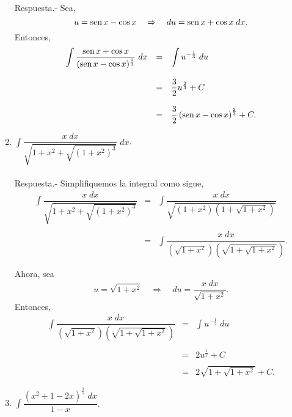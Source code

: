 \begin{enumerate}[\bfseries 1.]
	Respuesta.-\; Sea,
	$$u=\mathop{\mbox{\normalfont sen}}\nolimits x - \cos x\quad \Rightarrow \quad du=\mathop{\mbox{\normalfont sen}}\nolimits x + \cos x\; dx.$$
	Entonces,
	$$\begin{array}{rcl}
	    \displaystyle\int \dfrac{\mathop{\mbox{\normalfont sen}}\nolimits x + \cos x}{(\mathop{\mbox{\normalfont sen}}\nolimits x - \cos x)^{\frac{1}{3}}}\; dx &=& \displaystyle\int u^{-\frac{1}{3}}\; du\\\\
											    &=& \dfrac{3}{2}u^{\frac{2}{3}}+C\\\\
											    &=& \dfrac{3}{2}\left(\mathop{\mbox{\normalfont sen}}\nolimits x - \cos x\right)^{\frac{2}{3}}+C.
	\end{array}$$
	\vspace{.5cm}

    \item $\displaystyle\int \dfrac{x\; dx}{\sqrt{1+x^2+\sqrt{(1+x^2)^3}}} \; dx$.\\\\

	Respuesta.-\; Simplifiquemos la integral como sigue,
	$$\begin{array}{rcl}
	    \displaystyle\int \dfrac{x\; dx}{\sqrt{1+x^2+\sqrt{(1+x^2)^3}}} &=& \displaystyle\int \dfrac{x\; dx}{\sqrt{\left(1+x^2\right)\left(1+\sqrt{1+x^2}\right)}}\\\\
									    &=& \displaystyle\int \dfrac{x\; dx}{\left(\sqrt{1+x^2}\right)\left(\sqrt{1+\sqrt{1+x^2}}\right)}.\\\\
	\end{array}$$
	Ahora, sea
	$$u=\sqrt{1+x^2}\quad \Rightarrow \quad du=\dfrac{x\; dx}{\sqrt{1+x^2}}.$$
	Entonces,
	$$\begin{array}{rcl}
	    \displaystyle\int \dfrac{x\; dx}{\left(\sqrt{1+x^2}\right)\left(\sqrt{1+\sqrt{1+x^2}}\right)} &=& \displaystyle\int u^{-\frac{1}{2}}\; du\\\\
														      &=&2u^{\frac{1}{2}} +C\\\\
																					      &=&2\sqrt{1+\sqrt{1+x^2}} + C.
	\end{array}$$



    \item $\displaystyle\int \dfrac{\left(x^2+1-2x\right)^{\frac{1}{5}}\; dx}{1-x} $.\\\\


\end{enumerate}
